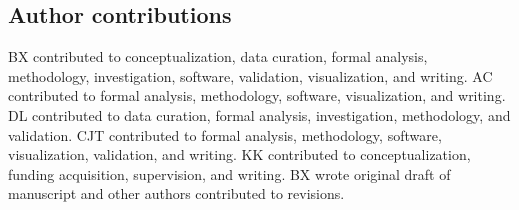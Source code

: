 \documentclass[authoryear]{article}
\begin{document}
\subsection*{Author contributions}

BX contributed to conceptualization, data curation, formal analysis, methodology, investigation, software, validation, visualization, and writing.
AC contributed to formal analysis, methodology, software, visualization, and writing.
DL contributed to data curation, formal analysis, investigation, methodology, and validation.
CJT contributed to formal analysis, methodology, software, visualization, validation, and writing.
KK contributed to conceptualization, funding acquisition, supervision, and writing. BX wrote original draft of manuscript and other authors contributed to revisions.

\singlespacing



\end{document}
